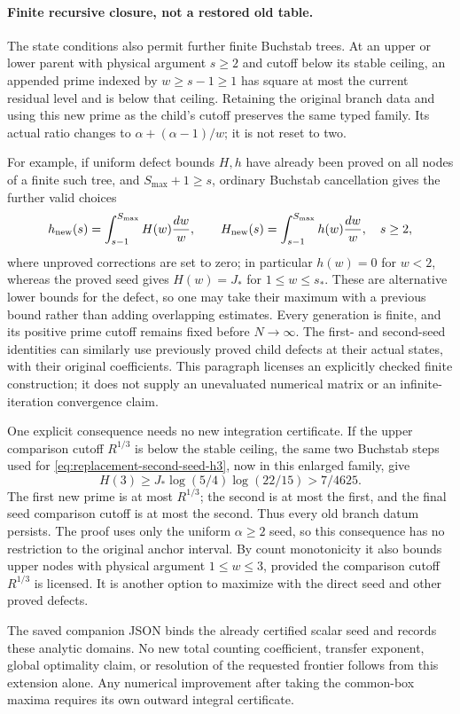 \paragraph{Finite recursive closure, not a restored old table.}
The state conditions also permit further finite Buchstab trees.
At an upper or lower parent with physical argument $s\ge2$ and
cutoff below its stable ceiling, an appended prime indexed by
$w\ge s-1\ge1$ has square at most the current residual level and
is below that ceiling.  Retaining the original branch data and
using this new prime as the child's cutoff preserves the same
typed family.  Its actual ratio changes to
$\alpha+(\alpha-1)/w$; it is not reset to two.

For example, if uniform defect bounds $H,h$ have already been proved
on all nodes of a finite such tree, and $S_{\max}+1\ge s$, ordinary
Buchstab cancellation gives the further valid choices
\[
 h_{\rm new}(s)=\int_{s-1}^{S_{\max}}H(w)\frac{dw}{w},\qquad
 H_{\rm new}(s)=\int_{s-1}^{S_{\max}}h(w)\frac{dw}{w},
 \quad s\ge2,
\]
where unproved corrections are set to zero; in particular $h(w)=0$
for $w<2$, whereas the proved seed gives $H(w)=J_*$ for
$1\le w\le s_*$.  These are alternative lower bounds for the
defect, so one may take their maximum with a previous bound rather
than adding overlapping estimates.  Every generation is finite,
and its positive prime cutoff remains fixed before $N\to\infty$.
The first- and second-seed identities can similarly use previously
proved child defects at their actual states, with their original
coefficients.  This paragraph licenses an explicitly checked finite
construction; it does not supply an unevaluated numerical matrix
or an infinite-iteration convergence claim.

One explicit consequence needs no new integration certificate.
If the upper comparison cutoff $R^{1/3}$ is below the stable ceiling,
the same two Buchstab steps used for
\eqref{eq:replacement-second-seed-h3}, now in this enlarged family,
give
\begin{equation}\label{eq:second-seed-stable-h3}
 H(3)\ge J_*\log(5/4)\log(22/15)>7/4625.
\end{equation}
The first new prime is at most $R^{1/3}$; the second is at most
the first, and the final seed comparison cutoff is at most the
second.  Thus every old branch datum persists.  The proof uses
only the uniform $\alpha\ge2$ seed, so this consequence has no
restriction to the original anchor interval.  By count monotonicity
it also bounds upper nodes with physical argument $1\le w\le3$,
provided the comparison cutoff $R^{1/3}$ is licensed.  It is another
option to maximize with the direct seed and other proved defects.

The saved companion JSON binds the already certified scalar seed
and records these analytic domains.  No new total counting
coefficient, transfer exponent, global optimality claim, or
resolution of the requested frontier follows from this extension
alone.  Any numerical improvement after taking the common-box
maxima requires its own outward integral certificate.
